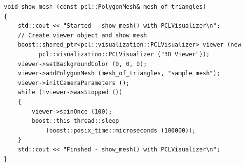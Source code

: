 \begin{lstlisting}[label=lstPrikaz,caption={Izvorni kod funkcije
\texttt{show\_mesh()} }]
void show_mesh (const pcl::PolygonMesh& mesh_of_triangles)
{
    std::cout << "Started - show_mesh() with PCLVisualizer\n";
    // Create viewer object and show mesh
    boost::shared_ptr<pcl::visualization::PCLVisualizer> viewer (new
          pcl::visualization::PCLVisualizer ("3D Viewer"));
    viewer->setBackgroundColor (0, 0, 0);
    viewer->addPolygonMesh (mesh_of_triangles, "sample mesh");
    viewer->initCameraParameters (); 
    while (!viewer->wasStopped ())
    {
        viewer->spinOnce (100); 
        boost::this_thread::sleep 
            (boost::posix_time::microseconds (100000));
    }
    std::cout << "Finshed - show_mesh() with PCLVisualizer\n";
}
\end{lstlisting}




